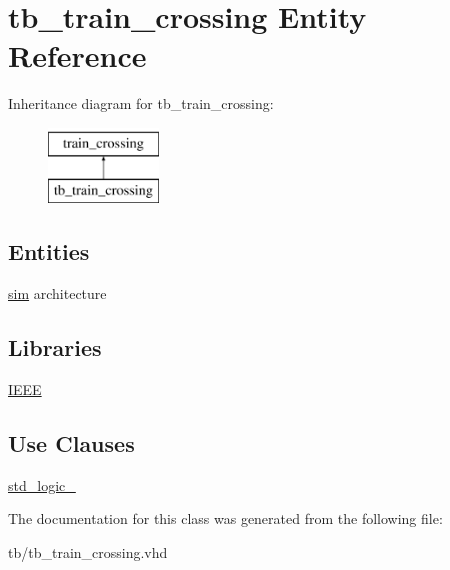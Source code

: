 \hypertarget{classtb__train__crossing}{}\section{tb\+\_\+train\+\_\+crossing Entity Reference}
\label{classtb__train__crossing}
Inheritance diagram for tb\+\_\+train\+\_\+crossing\+:\begin{figure}[H]
\begin{center}
\leavevmode
\includegraphics[height=2.000000cm]{classtb__train__crossing}
\end{center}
\end{figure}
\subsection*{Entities}
\begin{DoxyCompactItemize}
\item 
\hyperlink{classtb__train__crossing_1_1sim}{sim} architecture
\end{DoxyCompactItemize}
\subsection*{Libraries}
 \begin{DoxyCompactItemize}
\item 
\mbox{\label{classtb__train__crossing_ae4f03c286607f3181e16b9aa12d0c6d4}} 
\hyperlink{classtb__train__crossing_ae4f03c286607f3181e16b9aa12d0c6d4}{I\+E\+EE} 
\end{DoxyCompactItemize}
\subsection*{Use Clauses}
 \begin{DoxyCompactItemize}
\item 
\mbox{\label{classtb__train__crossing_acd03516902501cd1c7296a98e22c6fcb}} 
\hyperlink{classtb__train__crossing_acd03516902501cd1c7296a98e22c6fcb}{std\+\_\+logic\+\_}   
\end{DoxyCompactItemize}


The documentation for this class was generated from the following file\+:\begin{DoxyCompactItemize}
\item 
tb/tb\+\_\+train\+\_\+crossing.\+vhd\end{DoxyCompactItemize}
